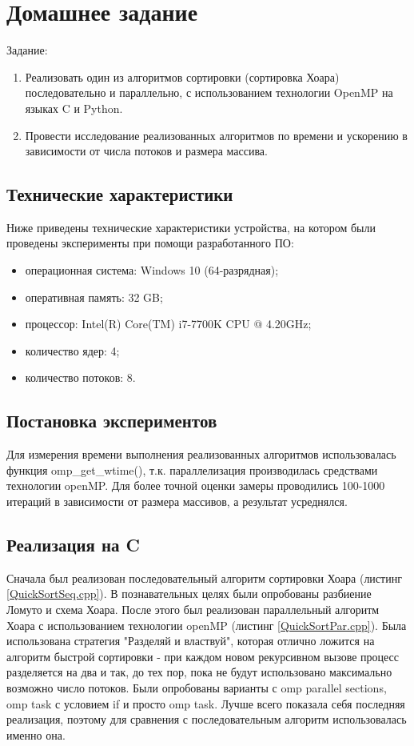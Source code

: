 \documentclass[a4paper,oneside,14pt]{extreport}
\begin{document}
\chapter*{Домашнее задание}

Задание:
\begin{enumerate}
	\item Реализовать один из алгоритмов сортировки (сортировка Хоара) последовательно и параллельно, с использованием технологии OpenMP на языках C и Python.
	\item Провести исследование реализованных алгоритмов по времени и ускорению в зависимости от числа потоков и размера массива.
\end{enumerate}

\section*{Технические характеристики}

Ниже приведены технические характеристики устройства, на котором были проведены эксперименты при помощи разработанного ПО:

\begin{itemize}
	\item операционная система: Windows 10 (64-разрядная);
	\item оперативная память: 32 GB;
	\item процессор: Intel(R) Core(TM) i7-7700K CPU @ 4.20GHz;
	\item количество ядер: 4;
	\item количество потоков: 8.
\end{itemize}

\section*{Постановка экспериментов}

Для измерения времени выполнения реализованных алгоритмов использовалась функция omp\_get\_wtime(), т.к. параллелизация производилась средствами технологии openMP. Для более точной оценки замеры проводились 100-1000 итераций в зависимости от размера массивов, а результат усреднялся.

\section*{Реализация на C}

Сначала был реализован последовательный алгоритм сортировки Хоара (листинг \ref{QuickSortSeq.cpp}). В познавательных целях были опробованы разбиение Ломуто и схема Хоара. После этого был реализован параллельный алгоритм Хоара с использованием технологии openMP (листинг \ref{QuickSortPar.cpp}). Была использована стратегия "Разделяй и властвуй", которая отлично ложится на алгоритм быстрой сортировки - при каждом новом рекурсивном вызове процесс разделяется на два и так, до тех пор, пока не будут использовано максимально возможно число потоков. Были опробованы варианты с omp parallel sections, omp task с условием if и просто omp task. Лучше всего показала себя последняя реализация, поэтому для сравнения с последовательным алгоритм использовалась именно она.
\end{document}
